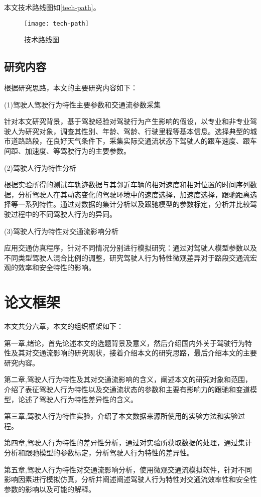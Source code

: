 本文技术路线图如\autoref{tech-path}。

\begin{figure}[htpb]
	\centering
	\texttt{[image: tech-path]}
	\caption{技术路线图}
	\label{tech-path}
\end{figure}

\subsection{研究内容}
根据研究思路，本文的主要研究内容如下：

(1)驾驶人驾驶行为特性主要参数和交通流参数采集

针对本文研究背景，基于驾驶经验对驾驶行为产生影响的假设，以专业和非专业驾驶人为研究对象，调查其性别、年龄、驾龄、行驶里程等基本信息。选择典型的城市道路路段，在良好天气条件下，采集实际交通流状态下驾驶人的跟车速度、跟车间距、加速度、等驾驶行为的主要参数。

(2)驾驶人行为特性分析

根据实验所得的测试车轨迹数据与其邻近车辆的相对速度和相对位置的时间序列数据，分析驾驶人在其动态变化的驾驶环境中的速度选择，加速度选择，跟驰距离选择等一系列特性。通过对数据的集计分析以及跟驰模型的参数标定，分析并比较驾驶过程中的不同驾驶人行为的异同。

(3)驾驶人行为特性对交通流影响分析

应用交通仿真程序，针对不同情况分别进行模拟研究：通过对驾驶人模型参数以及不同类型驾驶人混合比例的调整，研究驾驶人行为特性微观差异对于路段交通流宏观的效率和安全特性的影响。


\section{论文框架}
本文共分六章，本文的组织框架如下：

第一章,绪论，首先论述本文的选题背景及意义，然后介绍国内外关于驾驶行为特性及其对交通流影响的研究现状，接着介绍本文的研究思路，最后介绍本文的主要研究内容。

第二章,驾驶人行为特性及其对交通流影响的含义，阐述本文的研究对象和范围，介绍了表征驾驶人行为特性以及交通流状态的参数和主要有影响力的跟驰和变道模型，论述了驾驶人行为特性差异性的含义。

第三章,驾驶人行为特性实验，介绍了本文数据来源所使用的实验方法和实验过程。

第四章,驾驶人行为特性的差异性分析，通过对实验所获取数据的处理，通过集计分析和跟驰模型的参数标定，分析驾驶人行为特性的差异性。

第五章,驾驶人行为特性对交通流影响分析，使用微观交通流模拟软件，针对不同影响因素进行模拟仿真，分析并阐述阐述驾驶人行为特性对交通流效率性和安全性参数的影响以及可能的解释。

